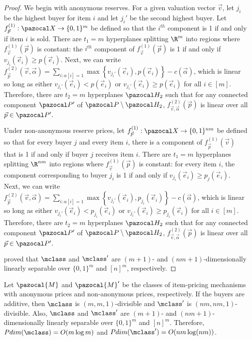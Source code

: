 \begin{proof}
We begin with anonymous reserves. For a given valuation vector $\vec{v}$, let $j_i$ be the highest buyer for item $i$ and let $j_i'$ be the second highest buyer. Let $f_{\vec{p}}^{(1)}: \domain \to \{0,1\}^m$ be defined so that the $i^{th}$ component is 1 if and only if item $i$ is sold. There are $t_1 = m$ hyperplanes splitting $\R^m$ into regions where $f_{\vec{v}}^{(1)}(\vec{p})$ is constant: the $i^{th}$ component of $f_{\vec{v}}^{(1)}(\vec{p})$ is 1 if and only if $v_{j_i}(\vec{e}_i) \geq p(\vec{e}_i)$. Next, we can write $f_{\vec{p}}^{(2)}(\vec{v}, \vec{\alpha}) = \sum_{i: \alpha[i] = 1 } \max\left\{v_{j_i'}(\vec{e}_i), p(\vec{e}_i)\right\} - c(\vec{\alpha})$, which is linear so long as either $v_{j_i'}(\vec{e}_i) <p(\vec{e}_i)$ or $v_{j_i'}(\vec{e}_i) \geq  p(\vec{e}_i)$ for all $i \in [m]$. Therefore, there are $t_2 = m$ hyperplanes $\hyp_2$ such that for any connected component $\pspace'$ of $\pspace \setminus \hyp_2$, $f_{\vec{v}, \vec{\alpha}}^{(2)}(\vec{p})$ is linear over all $\vec{p} \in \pspace'.$


Under non-anonymous reserve prices, let $f_{\vec{p}}^{(1)}: \domain \to \{0,1\}^{nm}$ be defined so that for every buyer $j$ and every item $i$, there is a component of $f_{\vec{p}}^{(1)}(\vec{v})$ that is 1 if and only if buyer $j$ receives item $i$. There are $t_1 = m$ hyperplanes splitting $\R^{nm}$ into regions where $f_{\vec{v}}^{(1)}(\vec{p})$ is constant: for every item $i$, the component corresponding to buyer $j_i$ is 1 if and only if $v_{j_i}(\vec{e}_i) \geq p_j(\vec{e}_i)$. Next, we can write $f_{\vec{p}}^{(2)}(\vec{v}, \vec{\alpha}) = \sum_{i: \alpha[i] = 1 } \max\left\{v_{j_i'}(\vec{e}_i), p_{j_i}(\vec{e}_i)\right\} - c(\vec{\alpha})$, which is linear so long as either $v_{j_i'}(\vec{e}_i) <p_{j_i}(\vec{e}_i)$ or $v_{j_i'}(\vec{e}_i) \geq  p_{j_i}(\vec{e}_i)$ for all $i \in [m]$. Therefore, there are $t_2 = m$ hyperplanes $\hyp_2$ such that for any connected component $\pspace'$ of $\pspace \setminus \hyp_2$, $f_{\vec{v}, \vec{\alpha}}^{(2)}(\vec{p})$ is linear over all $\vec{p} \in \pspace'.$

\citet{Morgenstern16:Learning} proved that $\mclass$ and $\mclass'$ are $(m+1)$- and $(nm+1)$-dimensionally linearly separable over $\{0,1\}^m$ and $[n]^m$, respectively.
\end{proof}

\begin{theorem}\label{thm:item_pricing_add_sep}
Let $\pazocal{M}$ and $\pazocal{M}'$ be the classes of item-pricing mechanisms with anonymous prices and non-anonymous prices, respectively. If the buyers are additive, then $\mclass$ is $(m, m, 1)$-divisible and $\mclass'$ is $(nm,nm,1)$-divisible. Also, $\mclass$ and $\mclass'$ are $(m+1)$- and $(nm+1)$-dimensionally linearly separable over $\{0,1\}^m$ and $[n]^m$. Therefore, $Pdim(\mclass) = O(m \log m)$ and $Pdim(\mclass') = O(nm \log (nm))$.
\end{theorem}

